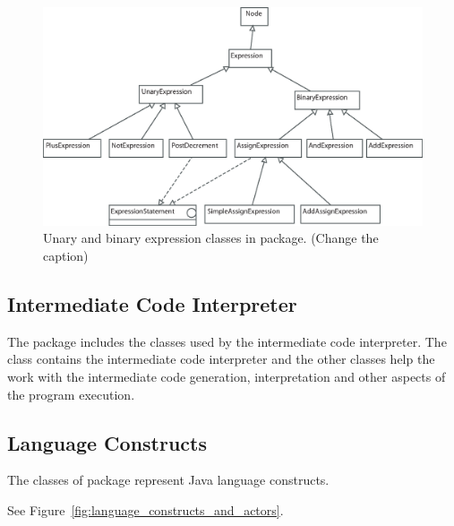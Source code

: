 \begin{figure}[!htb]
\begin{center}
\includegraphics[width=\textwidth]{images/unary-bin-exps.eps}
\caption{Unary and binary expression classes in  package. (Change the caption)}
\label{fig:un_and_bin_exp_classes}
\end{center}
\end{figure}

\subsection{Intermediate Code Interpreter}
\label{sec:Intermediate_Code_Interpreter}

The package  includes the classes used by the intermediate
code interpreter. The class  contains the intermediate code
interpreter and the other classes  help the work with the intermediate
code generation, interpretation and other aspects of the program execution.

\subsection{Language Constructs}
\label{sec:Language_package}

The classes of  package represent Java language constructs.

See Figure~\ref{fig:language_constructs_and_actors}.

